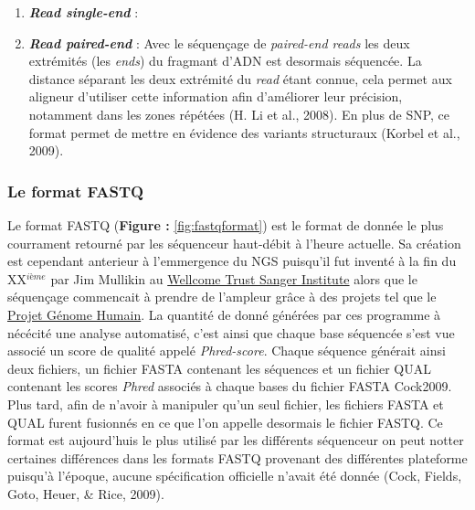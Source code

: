 \documentclass[12pt,twoside]{reedthesis}
\providecommand{\tightlist}{%
  \setlength{\itemsep}{0pt}\setlength{\parskip}{0pt}}
\theoremstyle{definition}
\theoremstyle{definition}
\theoremstyle{remark}
\begin{document}
  \begin{enumerate}
  \def\labelenumi{\arabic{enumi}.}
  \tightlist
  \item
    \textbf{\emph{Read single-end} }:\\
  \item
    \textbf{\emph{Read paired-end} }: Avec le séquençage de
    \emph{paired-end reads} les deux extrémités (les \emph{ends}) du
    fragmant d'ADN est desormais séquencée. La distance séparant les deux
    extrémité du \emph{read} étant connue, cela permet aux aligneur
    d'utiliser cette information afin d'améliorer leur précision,
    notamment dans les zones répétées (H. Li et al., 2008). En plus de
    SNP, ce format permet de mettre en évidence des variants structuraux
    (Korbel et al., 2009).
  \end{enumerate}
  
  \subsubsection{Le format FASTQ}\label{le-format-fastq}
  
  Le format FASTQ (\textbf{Figure : }\ref{fig:fastqformat}) est le format
  de donnée le plus courrament retourné par les séquenceur haut-débit à
  l'heure actuelle. Sa création est cependant anterieur à l'emmergence du
  NGS puisqu'il fut inventé à la fin du XX\(^{ième}\) par Jim Mullikin au
  \href{https://fr.wikipedia.org/wiki/Wellcome_Trust_Sanger_Institute}{Wellcome
  Trust Sanger Institute} alors que le séquençage commencait à prendre de
  l'ampleur grâce à des projets tel que le
  \href{https://fr.wikipedia.org/wiki/Projet_G\%C3\%A9nome_Humain}{Projet
  Génome Humain}. La quantité de donné générées par ces programme à
  nécécité une analyse automatisé, c'est ainsi que chaque base séquencée
  s'est vue associé un score de qualité appelé \emph{Phred-score}. Chaque
  séquence générait ainsi deux fichiers, un fichier FASTA contenant les
  séquences et un fichier QUAL contenant les scores \emph{Phred} associés
  à chaque bases du fichier FASTA Cock2009. Plus tard, afin de n'avoir à
  manipuler qu'un seul fichier, les fichiers FASTA et QUAL furent
  fusionnés en ce que l'on appelle desormais le fichier FASTQ. Ce format
  est aujourd'huis le plus utilisé par les différents séquenceur on peut
  notter certaines différences dans les formats FASTQ provenant des
  différentes plateforme puisqu'à l'époque, aucune spécification
  officielle n'avait été donnée (Cock, Fields, Goto, Heuer, \& Rice,
  2009).
  
\end{document}
